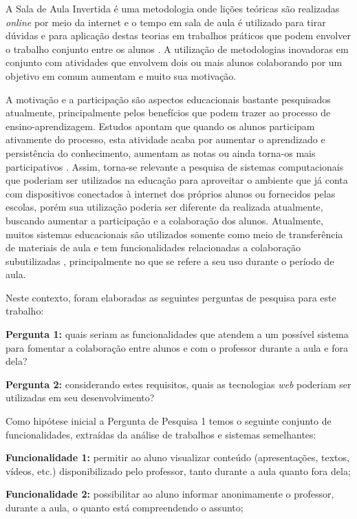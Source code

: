 A Sala de Aula Invertida é uma metodologia onde lições teóricas são realizadas \emph{online} por meio da internet e o tempo em sala de aula é utilizado para tirar dúvidas e para aplicação destas teorias em trabalhos práticos que podem envolver o trabalho conjunto entre os alunos \cite{staker_classifying_2012}. A utilização de metodologias inovadoras em conjunto com atividades que envolvem dois ou mais alunos colaborando por um objetivo em comum aumentam e muito sua motivação.

A motivação e a participação são aspectos educacionais bastante pesquisados atualmente, principalmente pelos benefícios que podem trazer ao processo de ensino-aprendizagem. Estudos apontam que quando os alunos participam ativamente do processo, esta atividade acaba por aumentar o aprendizado e persistência do conhecimento, aumentam as notas ou ainda torna-os mais participativos \cite{felder1992quick}. Assim, torna-se relevante a pesquisa de sistemas computacionais que poderiam ser utilizados na educação para aproveitar o ambiente que já conta com dispositivos conectados à internet dos próprios alunos ou fornecidos pelas escolas, porém sua utilização poderia ser diferente da realizada atualmente, buscando aumentar a participação e a colaboração dos alunos. Atualmente, muitos sistemas educacionais são utilizados somente como meio de transferência de materiais de aula e tem funcionalidades relacionadas a colaboração subutilizadas \cite{takeda_percepcao_2013}, principalmente no que se refere a seu uso durante o período de aula.

Neste contexto, foram elaboradas as seguintes perguntas de pesquisa para este trabalho:

\textbf{Pergunta 1:} quais seriam as funcionalidades que atendem a um possível sistema para fomentar a colaboração entre alunos e com o professor durante a aula e fora dela?

\textbf{Pergunta 2:} considerando estes requisitos, quais as tecnologias \emph{web} poderiam ser utilizadas em seu desenvolvimento?

Como hipótese inicial a Pergunta de Pesquisa 1 temos o seguinte conjunto de funcionalidades, extraídas da análise de trabalhos e sistemas semelhantes:

\textbf{Funcionalidade 1:} permitir ao aluno visualizar conteúdo (apresentações, textos, vídeos, etc.) disponibilizado pelo professor, tanto durante a aula quanto fora dela;

\textbf{Funcionalidade 2:} possibilitar ao aluno informar anonimamente o professor, durante a aula, o quanto está compreendendo o assunto;

